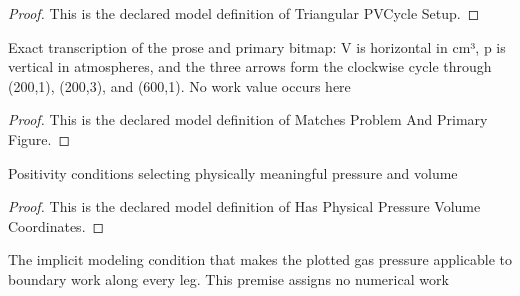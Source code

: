 \begin{proof}
  This is the declared model definition of Triangular PVCycle Setup.
\end{proof}
\begin{definition}
  \label{def:physics:phyx-mini-0417:phyxminiproblems-problemphyxmini0417-matchesproblemandprimaryfigure}
  Exact transcription of the prose and primary bitmap: V is horizontal in cm³, p is vertical in atmospheres, and the three arrows form the clockwise cycle through (200,1), (200,3), and (600,1). No work value occurs here
\end{definition}
\begin{proof}
  This is the declared model definition of Matches Problem And Primary Figure.
\end{proof}
\begin{definition}
  \label{def:physics:phyx-mini-0417:phyxminiproblems-problemphyxmini0417-hasphysicalpressurevolumecoordinates}
  Positivity conditions selecting physically meaningful pressure and volume
\end{definition}
\begin{proof}
  This is the declared model definition of Has Physical Pressure Volume Coordinates.
\end{proof}
\begin{definition}
  \label{def:physics:phyx-mini-0417:phyxminiproblems-problemphyxmini0417-isquasistaticcycle}
  The implicit modeling condition that makes the plotted gas pressure applicable to boundary work along every leg. This premise assigns no numerical work
\end{definition}
